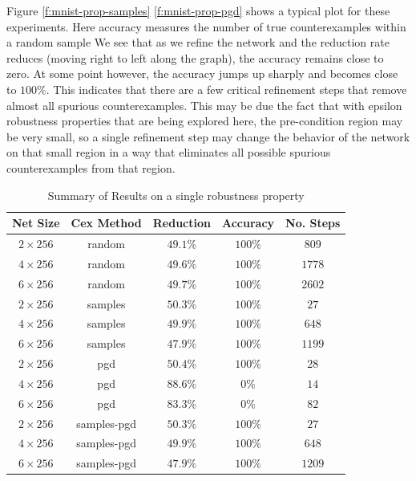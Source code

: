 Figure \ref{f:mnist-prop-samples} \ref{f:mnist-prop-pgd} shows a typical plot
for these experiments.  Here accuracy measures the number of true
counterexamples within a random sample
 We see that as we refine the
network and the reduction rate reduces (moving right to left along the graph),
the accuracy remains close to zero. At some point however, the accuracy jumps up
sharply and becomes close to $100\%$. This indicates that there are a few
critical refinement steps that remove almost all spurious counterexamples. This
may be due the fact that with epsilon robustness properties that are being
explored here, the pre-condition region may be very small, so a single
refinement step may change the behavior of the network on that small region in a
way that eliminates all possible spurious counterexamples from that region.

\begin{table}
\begin{tabular}{|c|c|c|c|c|}
    \hline
    Net Size     & Cex Method  & Reduction & Accuracy & No. Steps \\
    \hline
    $2\times256$ & random      & $49.1\%$  & $100\%$  & $ 809$    \\
    $4\times256$ & random      & $49.6\%$  & $100\%$  & $1778$    \\
    $6\times256$ & random      & $49.7\%$  & $100\%$  & $2602$    \\
    $2\times256$ & samples     & $50.3\%$  & $100\%$  & $  27$    \\
    $4\times256$ & samples     & $49.9\%$  & $100\%$  & $ 648$    \\
    $6\times256$ & samples     & $47.9\%$  & $100\%$  & $1199$    \\
    $2\times256$ & pgd         & $50.4\%$  & $100\%$  & $  28$    \\
    $4\times256$ & pgd         & $88.6\%$  & $  0\%$  & $  14$    \\
    $6\times256$ & pgd         & $83.3\%$  & $  0\%$  & $  82$    \\
    $2\times256$ & samples-pgd & $50.3\%$  & $100\%$  & $  27$    \\
    $4\times256$ & samples-pgd & $49.9\%$  & $100\%$  & $ 648$    \\
    $6\times256$ & samples-pgd & $47.9\%$  & $100\%$  & $1209$    \\
    \hline
\end{tabular}
\caption{Summary of \mnist Results on a single robustness property }
\label{t:mnist-prop-summary}
\end{table}

